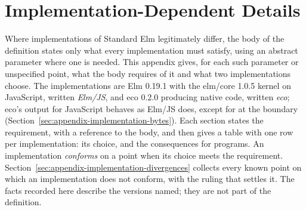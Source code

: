 
\chapter{Implementation-Dependent Details}\label{ch:appendix-implementation}

Where implementations of Standard Elm legitimately differ, the body of the
definition states only what every implementation must satisfy, using an
abstract parameter where one is needed. %
This appendix gives, for each such parameter or unspecified point, what the
body requires of it and what two implementations choose. The implementations
are Elm 0.19.1 with the elm/core 1.0.5 kernel on JavaScript, written
\emph{Elm/JS}, and eco 0.2.0 producing native code, written \emph{eco}; eco's
output for JavaScript behaves as Elm/JS does, except for  at the
boundary (Section~\ref{sec:appendix-implementation-bytes}). Each section states the
requirement, with a reference to the body, and then gives a table with one row
per implementation: its choice, and the consequences for programs. An
implementation \emph{conforms} on a point when its choice meets the
requirement. Section~\ref{sec:appendix-implementation-divergences} collects
every known point on which an implementation does not conform, with the
ruling that settles it. The facts recorded here describe the versions named;
they are not part of the definition.

